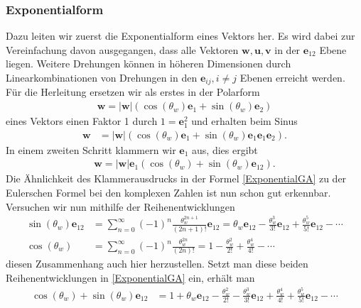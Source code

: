 \subsubsection{Exponentialform}
Dazu leiten wir zuerst die Exponentialform eines Vektors her. Es wird dabei zur Vereinfachung davon ausgegangen, dass alle Vektoren $\mathbf{w}, \mathbf{u}, \mathbf{v}$ in der $\mathbf{e}_{12}$ Ebene liegen. Weitere Drehungen können in höheren Dimensionen durch Linearkombinationen von Drehungen in den $\mathbf{e}_{ij}, i\not=j$ Ebenen erreicht werden. Für die Herleitung ersetzen wir als erstes in der Polarform
\begin{align}
	\mathbf{w} = |\mathbf{w}| \left(\cos(\theta_w) \mathbf{e}_1 + \sin(\theta_w) \mathbf{e}_2\right)
\end{align}
eines Vektors einen Faktor 1 durch $1=\mathbf{e}_1^2$ und erhalten beim Sinus
\begin{align}\label{e1ausklammern}
	\mathbf{w} &= |\mathbf{w}| \left(\cos(\theta_w) \mathbf{e}_1 + \sin(\theta_w) \mathbf{e}_1\mathbf{e}_1\mathbf{e}_2\right). 
\end{align}
In einem zweiten Schritt klammern wir $\mathbf{e}_1$ aus, dies ergibt
\begin{align}
	\mathbf{w} = |\mathbf{w}|\mathbf{e}_1\left(\cos(\theta_w)+ \sin(\theta_w) \mathbf{e}_{12}\right). \label{ExponentialGA}
\end{align}
Die Ähnlichkeit des Klammerausdrucks in der Formel \eqref{ExponentialGA} zu der Eulerschen Formel bei den komplexen Zahlen ist nun schon gut erkennbar. Versuchen wir nun mithilfe der Reihenentwicklungen
\begin{align}
	\sin(\theta_w)\mathbf{e}_{12}&=\sum _{n=0}^{\infty }(-1)^{n}{\frac {\theta_w^{2n+1}}{(2n+1)!}}\mathbf{e}_{12} =\theta_w\mathbf{e}_{12}-{\frac {\theta_w^{3}}{3!}}\mathbf{e}_{12}+{\frac {\theta_w^{5}}{5!}}\mathbf{e}_{12}-\cdots \\
	\cos(\theta_w)&=\sum _{n=0}^{\infty }(-1)^{n}{\frac {\theta_w^{2n}}{(2n)!}} =1-{\frac {\theta_w^{2}}{2!}}+{\frac {\theta_w^{4}}{4!}}-\cdots
\end{align}
diesen Zusammenhang auch hier herzustellen. Setzt man diese beiden Reihenentwicklungen in \eqref{ExponentialGA} ein, erhält man
\begin{align}
	\cos(\theta_w)+ \sin(\theta_w) \mathbf{e}_{12} &= 1+\theta_w\mathbf{e}_{12}-{\frac {\theta_w^{2}}{2!}}-{\frac {\theta_w^{3}}{3!}}\mathbf{e}_{12}+{\frac {\theta_w^{4}}{4!}}+{\frac {\theta_w^{5}}{5!}}\mathbf{e}_{12}-\cdots
\end{align}
